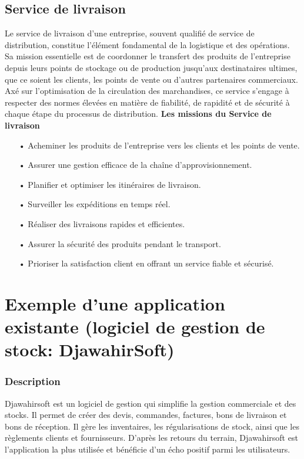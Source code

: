 \documentclass[edit,12pt,a4paper,ChapStyle,oneside,doubleinterligne]{report}
\begin{document}
\subsection{Service de livraison}
Le service de livraison d'une entreprise, souvent qualifié de service de distribution, constitue l'élément fondamental de la logistique et des opérations. Sa mission essentielle est de coordonner le transfert des produits de l'entreprise depuis leurs points de stockage ou de production jusqu'aux destinataires ultimes, que ce soient les clients, les points de vente ou d'autres partenaires commerciaux. Axé sur l'optimisation de la circulation des marchandises, ce service s'engage à respecter des normes élevées en matière de fiabilité, de rapidité et de sécurité à chaque étape du processus de distribution\cite{logistique}.
\newline\textbf{Les missions du Service de livraison}\newline
\begin{itemize}
    \item [•] Acheminer les produits de l'entreprise vers les clients et les points de vente.
    \item [•] Assurer une gestion efficace de la chaîne d'approvisionnement. 
    \item [•] Planifier et optimiser les itinéraires de livraison. 
    \item [•] Surveiller les expéditions en temps réel. 
    \item [•] Réaliser des livraisons rapides et efficientes. 
    \item [•] Assurer la sécurité des produits pendant le transport. 
    \item [•] Prioriser la satisfaction client en offrant un service fiable et sécurisé.
\end{itemize}




\section{Exemple d'une application existante (logiciel de gestion de stock: DjawahirSoft)}
\subsubsection{Description}
Djawahirsoft est un logiciel de gestion qui simplifie la gestion commerciale et des stocks. Il permet de créer des devis, commandes, factures, bons de livraison et bons de réception. Il gère les inventaires, les régularisations de stock, ainsi que les règlements clients et fournisseurs. D'après les retours du terrain, Djawahirsoft est l'application la plus utilisée et bénéficie d'un écho positif parmi les utilisateurs\cite{Djawahirsoft}.
\end{document}
